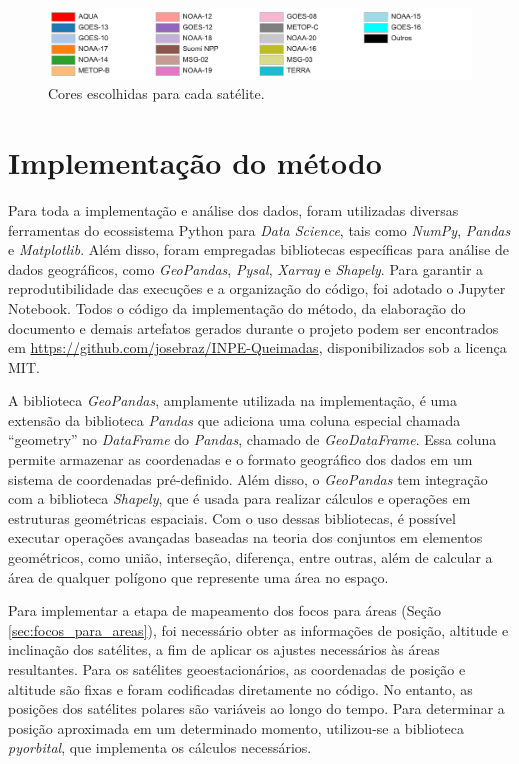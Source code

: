 \documentclass[cic,tc]{iiufrgs}
\begin{document}
\begin{figure}[!htb]
    \caption{Cores escolhidas para cada satélite.}
    \begin{center}
        \includegraphics[width=35em]{cores_satelites}
    \end{center}
    \label{fig:cores_satelites}
\end{figure}

\section{Implementação do método}

Para toda a implementação e análise dos dados, foram utilizadas diversas ferramentas do ecossistema Python para \textit{Data Science}, tais como \textit{NumPy}, \textit{Pandas} e \textit{Matplotlib}. Além disso, foram empregadas bibliotecas específicas para análise de dados geográficos, como \textit{GeoPandas}, \textit{Pysal}, \textit{Xarray} e \textit{Shapely}. Para garantir a reprodutibilidade das execuções e a organização do código, foi adotado o Jupyter Notebook. Todos o código da implementação do método, da elaboração do documento e demais artefatos gerados durante o projeto podem ser encontrados em \url{https://github.com/josebraz/INPE-Queimadas}, disponibilizados sob a licença MIT.

A biblioteca \textit{GeoPandas}, amplamente utilizada na implementação, é uma extensão da biblioteca \textit{Pandas} que adiciona uma coluna especial chamada ``geometry'' no \textit{DataFrame} do \textit{Pandas}, chamado de \textit{GeoDataFrame}. Essa coluna permite armazenar as coordenadas e o formato geográfico dos dados em um sistema de coordenadas pré-definido. Além disso, o \textit{GeoPandas} tem integração com a biblioteca \textit{Shapely}, que é usada para realizar cálculos e operações em estruturas geométricas espaciais. Com o uso dessas bibliotecas, é possível executar operações avançadas baseadas na teoria dos conjuntos em elementos geométricos, como união, interseção, diferença, entre outras, além de calcular a área de qualquer polígono que represente uma área no espaço.

Para implementar a etapa de mapeamento dos focos para áreas (Seção \ref{sec:focos_para_areas}), foi necessário obter as informações de posição, altitude e inclinação dos satélites, a fim de aplicar os ajustes necessários às áreas resultantes. Para os satélites geoestacionários, as coordenadas de posição e altitude são fixas e foram codificadas diretamente no código. No entanto, as posições dos satélites polares são variáveis ao longo do tempo. Para determinar a posição aproximada em um determinado momento, utilizou-se a biblioteca \textit{pyorbital}, que implementa os cálculos necessários.
\end{document}
